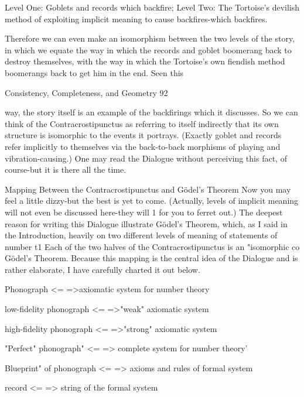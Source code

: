        Level One: Goblets and records which backfire;
       Level Two: The Tortoise's devilish method of exploiting implicit meaning to
                  cause backfires-which backfires.

        Therefore we can even make an isomorphism between the two levels of the story,
in which we equate the way in which the records and goblet boomerang back to destroy
themselves, with the way in which the Tortoise's own fiendish method boomerangs back
to get him in the end. Seen this




Consistency, Completeness, and Geometry                                                  92

way, the story itself is an example of the backfirings which it discusses. So we can think
of the Contracrostipunctus as referring to itself indirectly that its own structure is
isomorphic to the events it portrays. (Exactly goblet and records refer implicitly to
themselves via the back-to-back morphisms of playing and vibration-causing.) One may
read the Dialogue without perceiving this fact, of course-but it is there all the time.

                      Mapping Between the Contracrostipunctus
                               and Gödel’s Theorem
        Now you may feel a little dizzy-but the best is yet to come. (Actually, levels of
implicit meaning will not even be discussed here-they will 1 for you to ferret out.) The
deepest reason for writing this Dialogue illustrate Gödel’s Theorem, which, as I said in
the Introduction, heavily on two different levels of meaning of statements of number t1
Each of the two halves of the Contracrostipunctus is an "isomorphic co Gödel’s Theorem.
Because this mapping is the central idea of the Dialogue and is rather elaborate, I have
carefully charted it out below.

                     Phonograph <= =>axiomatic system for number theory

                    low-fidelity phonograph <= =>"weak" axiomatic system

                   high-fidelity phonograph <= =>"strong" axiomatic system

               "Perfect" phonograph" <= => complete system for number theory'

               Blueprint" of phonograph <= => axioms and rules of formal system

                            record <= => string of the formal system


